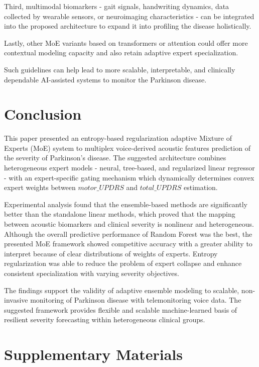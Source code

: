 \documentclass{customIEEEsingle}
\begin{document}
	Third, multimodal biomarkers - gait signals, handwriting dynamics, data collected by wearable sensors, or neuroimaging characteristics - can be integrated into the proposed architecture to expand it into profiling the disease holistically.
	
	Lastly, other MoE variants based on transformers or attention could offer more contextual modeling capacity and also retain adaptive expert specialization.
	
	Such guidelines can help lead to more scalable, interpretable, and clinically dependable AI-assisted systems to monitor the Parkinson disease.
	
	\section{Conclusion}\label{sec:conclusion}
	
	This paper presented an entropy-based regularization adaptive Mixture of Experts (MoE) system to multiplex voice-derived acoustic features prediction of the severity of Parkinson’s disease. The suggested architecture combines heterogeneous expert models - neural, tree-based, and regularized linear regressor - with an expert-specific gating mechanism which dynamically determines convex expert weights between $motor\_UPDRS$ and $total\_UPDRS$ estimation.
	
	Experimental analysis found that the ensemble-based methods are significantly better than the standalone linear methods, which proved that the mapping between acoustic biomarkers and clinical severity is nonlinear and heterogeneous. Although the overall predictive performance of Random Forest was the best, the presented MoE framework showed competitive accuracy with a greater ability to interpret because of clear distributions of weights of experts. Entropy regularization was able to reduce the problem of expert collapse and enhance consistent specialization with varying severity objectives.
	
	The findings support the validity of adaptive ensemble modeling to scalable, non-invasive monitoring of Parkinson disease with telemonitoring voice data. The suggested framework provides flexible and scalable machine-learned basis of resilient severity forecasting within heterogeneous clinical groups.
	
	\section*{Supplementary Materials} \label{sec:supplementary} 
	
\end{document}

